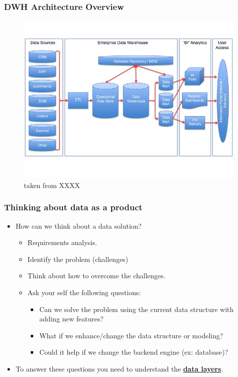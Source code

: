 \begin{frame}
	\frametitle{DWH Architecture Overview}
	\begin{figure}[ht]
		
		\centering
		\includegraphics[width=.9\linewidth,height=.8\textheight]{./Figures/chapter-01/Datawarehouse_reference_architecture.jpg}
			\caption{taken from XXXX}
	\end{figure}
\end{frame}
\begin{frame}
	\frametitle{Thinking about data as a product}

	\begin{itemize}[<+->]
		\item How can we think about a data solution?
			\begin{itemize}[<+->]
			\item Requirements analysis.
			\item Identify the problem (challenges)
			\item Think about how to overcome the challenges.
			\item Ask your self the following questions:
			\begin{itemize}[<+->]
				\item Can we solve the problem using the current data structure with adding new features?
				\item What if we enhance/change the data structure or modeling?
				\item Could it help if we change the backend engine (ex: database)?
			\end{itemize}			
		\end{itemize}
	\item To answer these questions you need to understand the \textbf{\underline{data layers}}.
	\end{itemize}
		
\end{frame}
